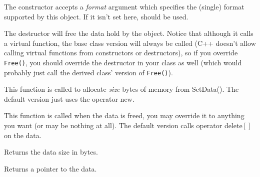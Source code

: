 
The constructor accepts a {\it format} argument which specifies the (single)
format supported by this object. If it isn't set here, 
 should be used.

\label{wxcustomdataobjectdtor}


The destructor will free the data hold by the object. Notice that although it
calls a virtual  function, the base
class version will always be called (C++ doesn't allow calling virtual
functions from constructors or destructors), so if you override {\tt Free()}, you
should override the destructor in your class as well (which would probably
just call the derived class' version of {\tt Free()}).

\label{wxcustomdataobjectalloc}


This function is called to allocate {\it size} bytes of memory from SetData().
The default version just uses the operator new.

\label{wxcustomdataobjectfree}


This function is called when the data is freed, you may override it to anything
you want (or may be nothing at all). The default version calls operator
delete$[]$ on the data.

\label{wxcustomdataobjectgetsize}


Returns the data size in bytes.

\label{wxcustomdataobjectgetdata}


Returns a pointer to the data.

\label{wxcustomdataobjectsetdata}


